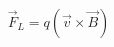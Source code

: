 \documentclass[preview]{standalone}
\begin{document}
\begin{align*}
\vec{F}_L = q(\vec{v} \times \vec{B})
\end{align*}
\end{document}

